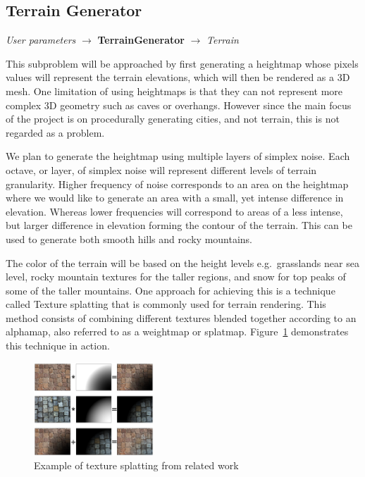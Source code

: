 \subsection{Terrain Generator}
\begin{center}
  \textit{User parameters} $\rightarrow$ \textbf{TerrainGenerator}  $\rightarrow$ \textit{Terrain}
\end{center}

This subproblem will be approached by first generating a heightmap whose pixels values will represent the terrain elevations, which will then be rendered as a 3D mesh.
One limitation of using heightmaps is that they can not represent more complex 3D geometry such as caves or overhangs.
However since the main focus of the project is on procedurally generating cities, and not terrain, this is not regarded as a problem.

We plan to generate the heightmap using multiple layers of simplex noise.
Each octave, or layer, of simplex noise will represent different levels of terrain granularity.
Higher frequency of noise corresponds to an area on the heightmap where we would like to generate an area with a small, yet intense difference in elevation.
Whereas lower frequencies will correspond to areas of a less intense, but larger difference in elevation forming the contour of the terrain.
This can be used to generate both smooth hills and rocky mountains.

The color of the terrain will be based on the height levels e.g.\ grasslands near sea level, rocky mountain textures for the taller regions, and snow for top peaks of some of the taller mountains.
One approach for achieving this is a technique called Texture splatting that is commonly used for terrain rendering.
This method consists of combining different textures blended together according to an alphamap, also referred to as a weightmap or splatmap.
Figure~\ref{fig:texture-splatting} demonstrates this technique in action.

\begin{figure}[H]
  \centering
  \includegraphics[width=0.4\textwidth]{figure/texture-splatting.png}
  \caption{Example of texture splatting from related work \cite{wiki:texture-splatting-img}}
  \label{fig:texture-splatting}
\end{figure}

